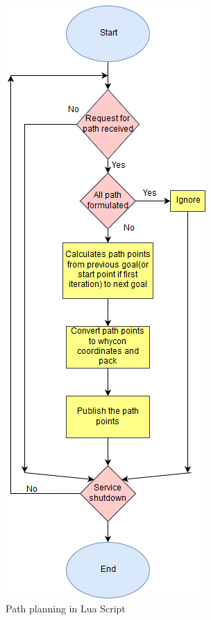 \begin{figure}[H]
    \centering
    \includegraphics[]{SummerInterReport/project/Images-Major/pathplan.png}
    \caption{Path planning in Lua Script}
    \label{fig:pathPlan}
\end{figure}

